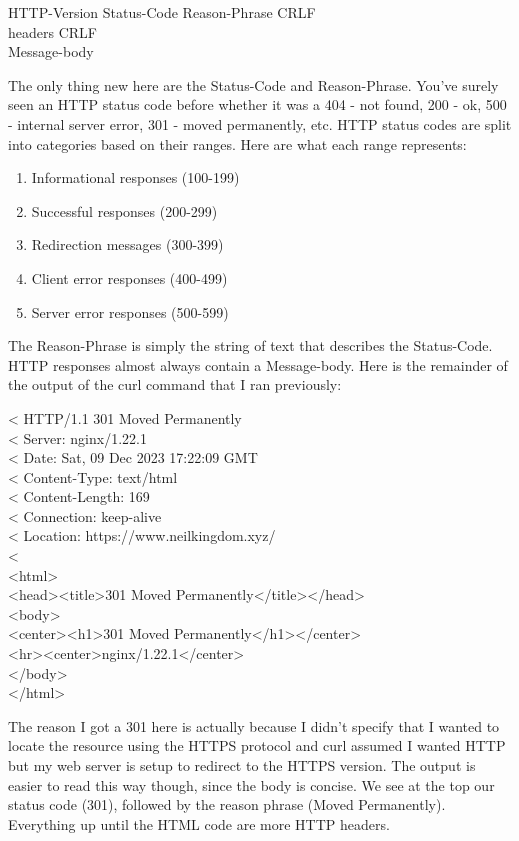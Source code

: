 \documentclass{article}
\begin{document}
HTTP-Version Status-Code Reason-Phrase CRLF\\
headers CRLF\\
Message-body

The only thing new here are the Status-Code and Reason-Phrase. You've surely seen an HTTP status code before
whether it was a 404 - not found, 200 - ok, 500 - internal server error, 301 - moved permanently, etc.
HTTP status codes are split into categories based on their ranges. Here are what each range represents:

\begin{enumerate}

\item Informational responses (100-199)

\item Successful responses (200-299)

\item Redirection messages (300-399)

\item Client error responses (400-499)

\item Server error responses (500-599)

\end{enumerate}

The Reason-Phrase is simply the string of text that describes the Status-Code. HTTP responses almost always
contain a Message-body. Here is the remainder of the output of the curl command that I ran previously:

< HTTP/1.1 301 Moved Permanently\\
< Server: nginx/1.22.1\\
< Date: Sat, 09 Dec 2023 17:22:09 GMT\\
< Content-Type: text/html\\
< Content-Length: 169\\
< Connection: keep-alive\\
< Location: https://www.neilkingdom.xyz/\\
<\\
<html>\\
<head><title>301 Moved Permanently</title></head>\\
<body>\\
<center><h1>301 Moved Permanently</h1></center>\\
<hr><center>nginx/1.22.1</center>\\
</body>\\
</html>

The reason I got a 301 here is actually because I didn't specify that I wanted to locate the resource using
the HTTPS protocol and curl assumed I wanted HTTP but my web server is setup to redirect to the HTTPS version.
The output is easier to read this way though, since the body is concise. We see at the top our status code
(301), followed by the reason phrase (Moved Permanently). Everything up until the HTML code are more HTTP
headers.
\end{document}

